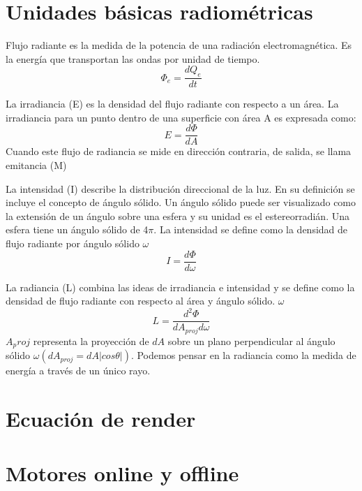 \section{Unidades b\'asicas radiom\'etricas}
    Flujo radiante es la medida de la potencia de una radiación electromagnética. Es la energía que
    transportan las ondas por unidad de tiempo.
    \begin{equation}
        \Phi_e = \dfrac{d{Q_e}}{dt}
    \end{equation}
    \singlespacing

    La irradiancia (E) es la densidad del flujo radiante con respecto a un \'area.
    La irradiancia para un punto dentro de una superficie con \'area A es expresada como:
    \begin{equation}
        E = \dfrac{d\Phi}{dA}
    \end{equation}
    Cuando este flujo de radiancia se mide en direcci\'on contraria, de salida, se llama emitancia (M)
    \singlespacing

    La intensidad (I) describe la distribuci\'on direccional de la luz. En su definici\'on se incluye
    el concepto de \'angulo s\'olido. Un \'angulo s\'olido puede ser visualizado como la extensi\'on
    de un \'angulo sobre una esfera y su unidad es el estereorradi\'an. Una esfera tiene un \'angulo
    s\'olido de 4$\pi$. La intensidad se define como la densidad de flujo radiante por \'angulo s\'olido
    $\omega$
    \begin{equation}
        I = \dfrac{d\Phi}{d\omega}
    \end{equation}
    \singlespacing

    La radiancia (L) combina las ideas de irradiancia e intensidad y se define como la densidad de flujo
    radiante con respecto al \'area y \'angulo s\'olido.
    $\omega$
    \begin{equation}
        L = \dfrac{d^2\Phi}{dA_{proj}d\omega}
    \end{equation}
    $A_proj$ representa la proyecci\'on de $dA$ sobre un plano perpendicular al \'angulo s\'olido
    $\omega (dA_{proj} = dA|cos\theta|)$. Podemos pensar en la radiancia como la medida de energía a
    trav\'es de un \'unico rayo.
    \singlespacing

\section{Ecuaci\'on de render}
    

\section{Motores online y offline}
